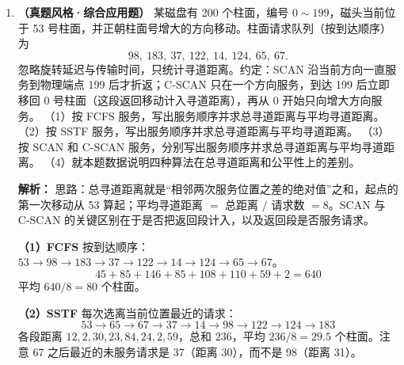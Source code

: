 \begin{enumerate}[start=7]
\textbf{（2）} 逻辑块号 $=20\text{ MiB}/1\text{ KiB}=20\,480$。直接块覆盖 $0\sim 11$；一级间接覆盖 $12\sim 12+255=267$；二级间接覆盖 $268\sim 268+65\,535=66\,803$。$20\,480$ 落在二级间接区。

在二级间接区内的序号为 $20\,480-268=20\,212$。二级间接块有 256 项，$20\,212=78\times 256+244$，所以它是二级间接块第 78 项所指向的那个一级间接块中的第 244 项（均从 0 编号，第 78 项指向的一级块负责二级区的第 $78\times 256\sim 78\times 256+255$ 块）。

读盘次数：i-node 已在内存，先读二级间接块（1 次），再读它第 78 项指向的一级间接块（1 次），最后读一级块第 244 项指向的数据块（1 次），共 3 次。

\textbf{（3）} 16 位表项可表示 $2^{16}=65\,536$ 个盘块，分区最大 $65\,536\times 1\text{ KiB}=64\text{ MiB}$；FAT 每块一项、每项 2 字节，占用 $65\,536\times 2\text{ B}=128\text{ KiB}$。

\else \answerarea[12] \fi

\vspace{8pt}

\item \textbf{（真题风格·综合应用题）} 某磁盘有 200 个柱面，编号 $0\sim 199$，磁头当前位于 53 号柱面，并正朝柱面号增大的方向移动。柱面请求队列（按到达顺序）为
\[
98,\ 183,\ 37,\ 122,\ 14,\ 124,\ 65,\ 67 .
\]
忽略旋转延迟与传输时间，只统计寻道距离。约定：SCAN 沿当前方向一直服务到物理端点 199 后才折返；C-SCAN 只在一个方向服务，到达 199 后立即移回 0 号柱面（这段返回移动计入寻道距离），再从 0 开始只向增大方向服务。
（1）按 FCFS 服务，写出服务顺序并求总寻道距离与平均寻道距离。
（2）按 SSTF 服务，写出服务顺序并求总寻道距离与平均寻道距离。
（3）按 SCAN 和 C-SCAN 服务，分别写出服务顺序并求总寻道距离与平均寻道距离。
（4）就本题数据说明四种算法在总寻道距离和公平性上的差别。

\ifshowsolutions\par\noindent\textbf{解析：} 思路：总寻道距离就是“相邻两次服务位置之差的绝对值”之和，起点的第一次移动从 53 算起；平均寻道距离 $=$ 总距离 $/$ 请求数 $=8$。SCAN 与 C-SCAN 的关键区别在于是否把返回段计入，以及返回段是否服务请求。

\textbf{（1）FCFS} 按到达顺序：$53\to98\to183\to37\to122\to14\to124\to65\to67$。
\[
45+85+146+85+108+110+59+2=640
\]
平均 $640/8=80$ 个柱面。

\textbf{（2）SSTF} 每次选离当前位置最近的请求：
\[
53\to65\to67\to37\to14\to98\to122\to124\to183
\]
各段距离 $12,2,30,23,84,24,2,59$，总和 $236$，平均 $236/8=29.5$ 个柱面。注意 67 之后最近的未服务请求是 37（距离 30），而不是 98（距离 31）。


\end{enumerate}
